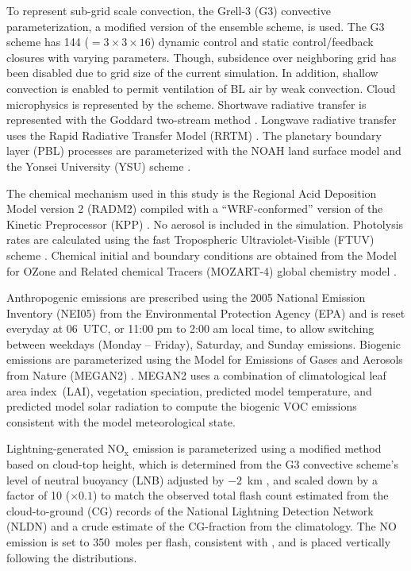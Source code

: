To represent sub-grid scale convection, the Grell-3 (G3) convective parameterization, a modified version of the
\citet{Grell:2002bs} ensemble scheme, is used. The G3 scheme has 144 ($=3\times3\times16$) dynamic control and
static control/feedback closures with varying parameters. Though, subsidence over neighboring grid has been
disabled due to grid size of the current simulation. In addition, shallow convection is
enabled to permit ventilation of BL air by weak convection.
Cloud microphysics is represented by the \citet{Thompson:2008vn}
scheme. Shortwave
radiative transfer is represented with the Goddard two-stream method \citep{Chou:1998kx}.
Longwave radiative transfer uses the
Rapid Radiative Transfer Model (RRTM) \citep{Mlawer:1997vn}. The planetary boundary layer (PBL)
processes are parameterized with the NOAH land surface model \citep{Chen:2001ys} and the
Yonsei University (YSU) scheme \citep{Hong:2006fk}.

The chemical mechanism used in this study is the Regional Acid Deposition Model version 2
(RADM2) \citep{Stockwell:1990ez} compiled with a ``WRF-conformed'' version of the Kinetic
Preprocessor (KPP) \citep{Sandu:2006jl}. No aerosol is included in the simulation. Photolysis
rates are calculated using the fast Tropospheric Ultraviolet-Visible (FTUV) scheme \citep{Tie:2003ve}.
Chemical initial and boundary conditions are obtained from the Model for OZone and Related
chemical Tracers (MOZART-4) global chemistry model \citep{Emmons:2010fk}.

Anthropogenic emissions are prescribed using the 2005 National Emission Inventory (NEI05) from the
Environmental Protection Agency (EPA) and is reset everyday at 06~UTC, or 11:00 pm to 2:00 am
local time, to allow switching between weekdays (Monday -- Friday), Saturday, and Sunday
emissions. Biogenic emissions are parameterized using the Model for Emissions of Gases and Aerosols
from Nature (MEGAN2) \citep{Guenther:2006kl}. MEGAN2 uses a combination of climatological leaf area
index~(LAI), vegetation speciation, predicted model temperature, and predicted model solar radiation
to compute the biogenic VOC emissions consistent with the model meteorological state.

Lightning-generated NO$_\mathrm{x}$ emission is parameterized using a modified \citet{Price:1992wb}
method based on cloud-top height, which is determined from the G3 convective scheme's level of neutral buoyancy 
(LNB) adjusted by $-2$~km \citep{Wong:2013vn}, and scaled down by a factor of 10 ($\times0.1$) to match the observed total
flash count estimated from the cloud-to-ground (CG) records of the National Lightning Detection
Network (NLDN) \citep{Cummins:2009aa} and a crude estimate of the CG-fraction from the
\citet{Boccippio:2001ys} climatology. The NO emission is set to 350~moles per flash, consistent
with \citet{Barth:2012qf}, and is placed vertically following the \citet{Ott:2010lo} distributions.


